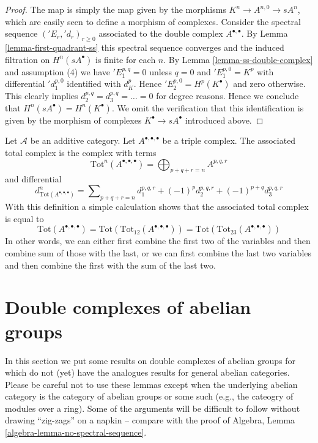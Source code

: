 \begin{proof}
The map is simply the map given by the morphisms
$K^n \to A^{n, 0} \to sA^n$, which are easily seen to define
a morphism of complexes.
Consider the spectral sequence $({}'E_r, {}'d_r)_{r \geq 0}$
associated to the double complex $A^{\bullet, \bullet}$.
By Lemma \ref{lemma-first-quadrant-ss} this spectral sequence converges
and the induced filtration on $H^n(sA^\bullet)$ is finite for each $n$.
By Lemma \ref{lemma-ss-double-complex} and assumption (4) we have
${}'E_1^{p, q} = 0$ unless $q = 0$ and $'E_1^{p, 0} = K^p$
with differential ${}'d_1^{p, 0}$ identified with $d_K^p$.
Hence ${}'E_2^{p, 0} = H^p(K^\bullet)$ and zero otherwise.
This clearly implies $d_2^{p, q} = d_3^{p, q} = \ldots = 0$
for degree reasons. Hence we conclude that $H^n(sA^\bullet) = H^n(K^\bullet)$.
We omit the verification that this identification is given by the
morphism of complexes $K^\bullet \to sA^\bullet$ introduced above.
\end{proof}

\begin{remark}
\label{remark-triple-complex}
Let $\mathcal{A}$ be an additive category. Let $A^{\bullet, \bullet, \bullet}$
be a triple complex. The associated total complex is the complex with
terms
$$
\text{Tot}^n(A^{\bullet, \bullet, \bullet}) =
\bigoplus\nolimits_{p + q + r = n} A^{p, q, r}
$$
and differential
$$
d^n_{\text{Tot}(A^{\bullet, \bullet, \bullet})} =
\sum\nolimits_{p + q + r = n}
d_1^{p, q, r} + (-1)^pd_2^{p, q, r} + (-1)^{p + q}d_3^{p, q, r}
$$
With this definition a simple calculation shows that the associated total
complex is equal to
$$
\text{Tot}(A^{\bullet, \bullet, \bullet}) =
\text{Tot}(\text{Tot}_{12}(A^{\bullet, \bullet, \bullet})) =
\text{Tot}(\text{Tot}_{23}(A^{\bullet, \bullet, \bullet}))
$$
In other words, we can either first combine the first two of the variables
and then combine sum of those with the last, or we can first combine the
last two variables and then combine the first with the sum of the last two.
\end{remark}




\section{Double complexes of abelian groups}
\label{section-double-complexes-abelian-groups}

\noindent
In this section we put some results on double complexes of abelian groups
for which do not (yet) have the analogues results for general abelian
categories. Please be careful not to use these lemmas except when the
underlying abelian category is the category of abelian groups or some
such (e.g., the cateogry of modules over a ring). Some of the arguments
will be difficult to follow without drawing ``zig-zags'' on a napkin --
compare with the proof of
Algebra, Lemma \ref{algebra-lemma-no-spectral-sequence}.

